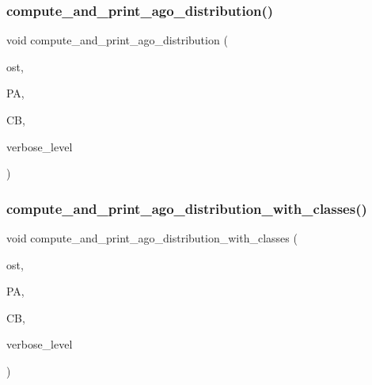 \mbox{\label{projective__space__main_8_c_abc36e14ed82bd09be516755b5b717d68}} 
\subsubsection{\texorpdfstring{compute\+\_\+and\+\_\+print\+\_\+ago\+\_\+distribution()}{compute\_and\_print\_ago\_distribution()}}
{\footnotesize\ttfamily void compute\+\_\+and\+\_\+print\+\_\+ago\+\_\+distribution (\begin{DoxyParamCaption}\item[{ostream \&}]{ost,  }\item[{\mbox{\hyperlink{classprojective__space__with__action}{projective\+\_\+space\+\_\+with\+\_\+action}} $\ast$}]{PA,  }\item[{\mbox{\hyperlink{classclassify__bitvectors}{classify\+\_\+bitvectors}} $\ast$}]{CB,  }\item[{\mbox{\hyperlink{galois_8h_a09fddde158a3a20bd2dcadb609de11dc}{I\+NT}}}]{verbose\+\_\+level }\end{DoxyParamCaption})}

\mbox{\label{projective__space__main_8_c_ac64ecd71e4db92860ba230d89959dd8e}} 
\subsubsection{\texorpdfstring{compute\+\_\+and\+\_\+print\+\_\+ago\+\_\+distribution\+\_\+with\+\_\+classes()}{compute\_and\_print\_ago\_distribution\_with\_classes()}}
{\footnotesize\ttfamily void compute\+\_\+and\+\_\+print\+\_\+ago\+\_\+distribution\+\_\+with\+\_\+classes (\begin{DoxyParamCaption}\item[{ostream \&}]{ost,  }\item[{\mbox{\hyperlink{classprojective__space__with__action}{projective\+\_\+space\+\_\+with\+\_\+action}} $\ast$}]{PA,  }\item[{\mbox{\hyperlink{classclassify__bitvectors}{classify\+\_\+bitvectors}} $\ast$}]{CB,  }\item[{\mbox{\hyperlink{galois_8h_a09fddde158a3a20bd2dcadb609de11dc}{I\+NT}}}]{verbose\+\_\+level }\end{DoxyParamCaption})}

